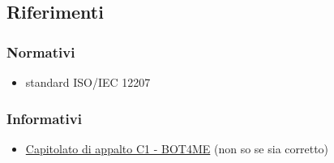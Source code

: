 \subsection{Riferimenti}

\subsubsection{Normativi}
\begin{itemize}
	\item standard ISO/IEC 12207
\end{itemize}

\subsubsection{Informativi}
\begin{itemize}
	\item \href{https://www.math.unipd.it/~tullio/IS-1/2021/Progetto/C1.pdf}{\color{blue} Capitolato di appalto C1 - BOT4ME}   (non so se sia corretto)
\end{itemize}
\newpage